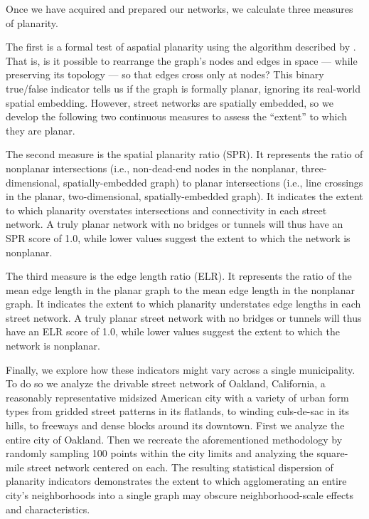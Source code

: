\documentclass[Afour,sageh,times]{sagej}
\begin{document}
Once we have acquired and prepared our networks, we calculate three measures of planarity.

The first is a formal test of aspatial planarity using the algorithm described by \citet{boyer_subgraph_2012}. That is, is it possible to rearrange the graph's nodes and edges in space --- while preserving its topology --- so that edges cross only at nodes? This binary true/false indicator tells us if the graph is formally planar, ignoring its real-world spatial embedding. However, street networks are spatially embedded, so we develop the following two continuous measures to assess the \enquote{extent} to which they are planar.

The second measure is the spatial planarity ratio (SPR). It represents the ratio of nonplanar intersections (i.e., non-dead-end nodes in the nonplanar, three-dimensional, spatially-embedded graph) to planar intersections (i.e., line crossings in the planar, two-dimensional, spatially-embedded graph). It indicates the extent to which planarity overstates intersections and connectivity in each street network. A truly planar network with no bridges or tunnels will thus have an SPR score of 1.0, while lower values suggest the extent to which the network is nonplanar.

The third measure is the edge length ratio (ELR). It represents the ratio of the mean edge length in the planar graph to the mean edge length in the nonplanar graph. It indicates the extent to which planarity understates edge lengths in each street network. A truly planar street network with no bridges or tunnels will thus have an ELR score of 1.0, while lower values suggest the extent to which the network is nonplanar.

Finally, we explore how these indicators might vary across a single municipality. To do so we analyze the drivable street network of Oakland, California, a reasonably representative midsized American city with a variety of urban form types from gridded street patterns in its flatlands, to winding culs-de-sac in its hills, to freeways and dense blocks around its downtown. First we analyze the entire city of Oakland. Then we recreate the aforementioned methodology by randomly sampling 100 points within the city limits and analyzing the square-mile street network centered on each. The resulting statistical dispersion of planarity indicators demonstrates the extent to which agglomerating an entire city's neighborhoods into a single graph may obscure neighborhood-scale effects and characteristics.
\end{document}

